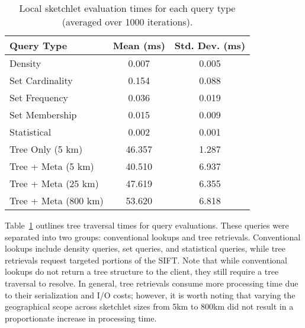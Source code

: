 \begin{table}
    \renewcommand{\arraystretch}{1.2}
    \caption{Local sketchlet evaluation times for each query type (averaged over 1000 iterations). \vspace{-1em}}
    \label{tbl:query-times}
    \begin{center}
        \begin{tabular}{|l|c|c|}
            \hline
            \textbf{Query Type}      & \textbf{Mean (ms)} & \textbf{Std. Dev. (ms)} \\
            \hline
            Density                  & 0.007                    & 0.005 \\
            \hline
            Set Cardinality          & 0.154                    & 0.088 \\
            \hline
            Set Frequency            & 0.036                    & 0.019 \\
            \hline
            Set Membership           & 0.015                    & 0.009 \\
            \hline
            Statistical               & 0.002                    & 0.001 \\
            \hline
            \hline
            Tree Only (5 km)        & 46.357                   & 1.287 \\
            \hline
            Tree + Meta (5 km)      & 40.510                   & 6.937 \\
            \hline
            Tree + Meta (25 km)     & 47.619                   & 6.355 \\
            \hline
            Tree + Meta (800 km)    & 53.620                   & 6.818 \\
            \hline
        \end{tabular}
    \end{center}
    \vspace{-2em}
\end{table}
Table~\ref{tbl:query-times} outlines tree traversal times for query evaluations. These queries were separated into two groups: conventional lookups and tree retrievals. Conventional lookups include density queries, set queries, and statistical queries, while tree retrievals request targeted portions of the SIFT.  Note that while conventional lookups do not return a tree structure to the client, they still require a tree traversal to resolve. In general, tree retrievals consume more processing time due to their serialization and I/O costs; however, it is worth noting that varying the geographical scope across sketchlet sizes from 5km to 800km did not result in a proportionate increase in processing time.%
